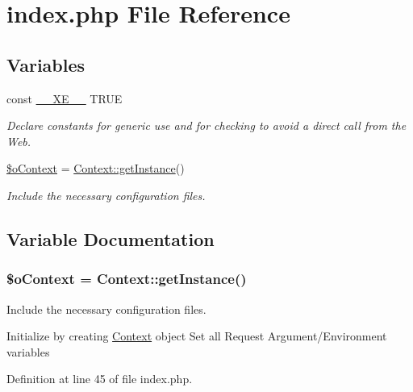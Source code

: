 \hypertarget{index_8php}{}\section{index.\+php File Reference}
\label{index_8php}
\subsection*{Variables}
\begin{DoxyCompactItemize}
\item 
const \hyperlink{index_8php_a697de427d83b791899ae45d555377756}{\+\_\+\+\_\+\+X\+E\+\_\+\+\_\+} T\+R\+U\+E
\begin{DoxyCompactList}\small\item\em Declare constants for generic use and for checking to avoid a direct call from the Web. \end{DoxyCompactList}\item 
\hyperlink{index_8php_aacfc569bef069a536ba65859b245068b}{\$o\+Context} = \hyperlink{classContext_a399e419617c7fe9b0c9eaf22c431df69}{Context\+::get\+Instance}()
\begin{DoxyCompactList}\small\item\em Include the necessary configuration files. \end{DoxyCompactList}\end{DoxyCompactItemize}


\subsection{Variable Documentation}
\hypertarget{index_8php_aacfc569bef069a536ba65859b245068b}{}
\subsubsection[{\$o\+Context}]{\setlength{\rightskip}{0pt plus 5cm}\$o\+Context = {\bf Context\+::get\+Instance}()}\label{index_8php_aacfc569bef069a536ba65859b245068b}


Include the necessary configuration files. 

Initialize by creating \hyperlink{classContext}{Context} object Set all Request Argument/\+Environment variables 

Definition at line 45 of file index.\+php.

\hypertarget{index_8php_a697de427d83b791899ae45d555377756}{}
